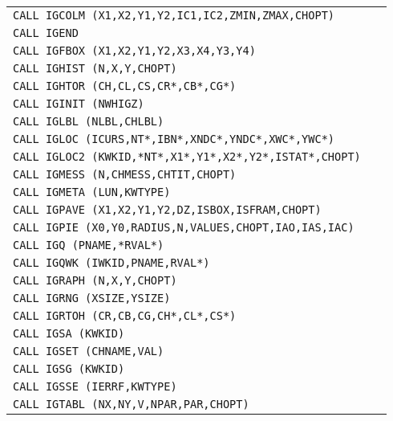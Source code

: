 \begin{longtable}{|>{\small\tt}p{.92\linewidth}r|}
CALL IGCOLM (X1,X2,Y1,Y2,IC1,IC2,ZMIN,ZMAX,CHOPT)     & \pageref{IGCOLM} \\
CALL IGEND                                            & \pageref{IGEND}  \\
CALL IGFBOX (X1,X2,Y1,Y2,X3,X4,Y3,Y4)                 & \pageref{IGFBOX} \\
CALL IGHIST (N,X,Y,CHOPT)                             & \pageref{IGHIST} \\
CALL IGHTOR (CH,CL,CS,CR*,CB*,CG*)                    & \pageref{IGHTOR} \\
CALL IGINIT (NWHIGZ)                                  & \pageref{IGINIT} \\
CALL IGLBL (NLBL,CHLBL)                               & \pageref{IGLBL}  \\
CALL IGLOC (ICURS,NT*,IBN*,XNDC*,YNDC*,XWC*,YWC*)     & \pageref{IGLOC}  \\
CALL IGLOC2 (KWKID,*NT*,X1*,Y1*,X2*,Y2*,ISTAT*,CHOPT) & \pageref{IGLOC2} \\
CALL IGMESS (N,CHMESS,CHTIT,CHOPT)                    & \pageref{IGMESS} \\
CALL IGMETA (LUN,KWTYPE)                              & \pageref{IGMETA} \\
CALL IGPAVE (X1,X2,Y1,Y2,DZ,ISBOX,ISFRAM,CHOPT)       & \pageref{IGPAVE} \\
CALL IGPIE (X0,Y0,RADIUS,N,VALUES,CHOPT,IAO,IAS,IAC)  & \pageref{IGPIE}  \\
CALL IGQ (PNAME,*RVAL*)                               & \pageref{IGQ}    \\
CALL IGQWK (IWKID,PNAME,RVAL*)                        & \pageref{IGQWK}  \\
CALL IGRAPH (N,X,Y,CHOPT)                             & \pageref{IGRAPH} \\
CALL IGRNG (XSIZE,YSIZE)                              & \pageref{IGRNG}  \\
CALL IGRTOH (CR,CB,CG,CH*,CL*,CS*)                    & \pageref{IGRTOH} \\
CALL IGSA (KWKID)                                     & \pageref{IGSA}   \\
CALL IGSET (CHNAME,VAL)                               & \pageref{IGSET}  \\
CALL IGSG (KWKID)                                     & \pageref{IGSG}   \\
CALL IGSSE (IERRF,KWTYPE)                             & \pageref{IGSSE}  \\
CALL IGTABL (NX,NY,V,NPAR,PAR,CHOPT)                  & \pageref{IGTABL} \\

\end{longtable}
